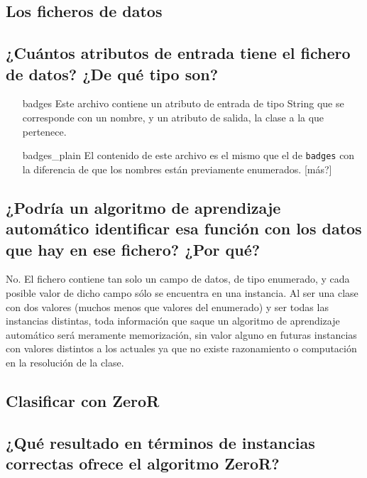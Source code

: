 \documentclass[12pt]{article}
\begin{document}
\tableofcontents

\newpage

\begin{center}
\section{Los ficheros de datos}
\end{center}

\subsection{\small ¿Cuántos atributos de entrada tiene el fichero de datos?
¿De qué tipo son?}

\begin{itemize}
  \item[badges] Este archivo contiene un atributo de entrada de tipo String que
  se corresponde con un nombre, y un atributo de salida, la clase a la que
  pertenece.
  \item[badges\_plain] El contenido de este archivo es el mismo que el de
  \texttt{badges} con la diferencia de que los nombres están previamente
  enumerados. [más?]
\end{itemize}

\subsection{\small ¿Podría un algoritmo de aprendizaje automático identificar
esa función con los datos que hay en ese fichero? ¿Por qué?}

No. El fichero contiene tan solo un campo de datos, de tipo enumerado, y cada
posible valor de dicho campo sólo se encuentra en una instancia. Al ser una
clase con dos valores (muchos menos que valores del enumerado) y ser todas las
instancias distintas, toda información que saque un algoritmo de aprendizaje
automático será meramente memorización, sin valor alguno en futuras instancias
con valores distintos a los actuales ya que no existe razonamiento o
computación en la resolución de la clase.

\newpage

\begin{center}
\section{Clasificar con ZeroR}
\end{center}

\subsection{\small ¿Qué resultado en términos de instancias correctas ofrece el
algoritmo ZeroR?}
\end{document}

